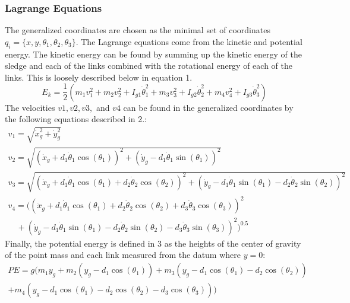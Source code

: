 \documentclass{article}
\begin{document}
\subsubsection{Lagrange Equations}
The generalized coordinates are chosen as the minimal set of coordinates $q_i = \{ x,y,\theta_1,\theta_2,\theta_3 \} $. The Lagrange equations come from the kinetic and potential energy. The kinetic energy can be found by summing up the kinetic energy of the sledge and each of the links combined with the rotational energy of each of the links. This is loosely described below in equation 1.
\begin{equation}\label{Kinetic Energy Equation}
	E_k = \frac{1}{2} \left( m_1 v_1^2 + m_2 v_2^2 + I_{g1} \dot{\theta}_1^2 + m_3 v_3^2 + I_{g2} \dot{\theta}_2^2 + m_4 v_4^2 + I_{g3} \dot{\theta}_3^2 \right) 
\end{equation}
The velocities $v1, v2, v3,$ and $v4$ can be found in the generalized coordinates by the following equations described in 2.:
\begin{equation}
	\begin{split}
		v_1 = \sqrt{\dot{x}_g^2 + \dot{y}_g^2} \\
		v_2 = \sqrt{\left( \dot{x}_g + d_1 \dot{\theta}_1 \cos(\theta_1) \right)^2 + \left( \dot{y}_g - d_1 \dot{\theta}_1 \sin(\theta_1) \right)^2} \\
		v_3 = \sqrt{\left( \dot{x}_g + d_1 \dot{\theta}_1 \cos(\theta_1) + d_2 \dot{\theta}_2 \cos(\theta_2) \right)^2 + \left( \dot{y}_g - d_1 \dot{\theta}_1 \sin(\theta_1) - d_2 \dot{\theta}_2 \sin(\theta_2) \right)^2}\\		
		v_4 = (\left( \dot{x}_g + d_1 \dot{\theta}_1 \cos(\theta_1) + d_2 \dot{\theta}_2 \cos(\theta_2) + d_3 \dot{\theta}_3 \cos(\theta_3) \right)^2 \\
		\quad + \left( \dot{y}_g - d_1 \dot{\theta}_1 \sin(\theta_1) - d_2 \dot{\theta}_2 \sin(\theta_2) - d_3 \dot{\theta}_3 \sin(\theta_3) \right)^2)^{0.5}
	\end{split}
\end{equation}
Finally, the potential energy is defined in 3 as the heights of the center of gravity of the point mass and each link measured from the datum where $y=0$:
\begin{equation}
	\begin{split}
			PE = g ( m_1 y_g + m_2 \left( y_g - d_1 \cos(\theta_1) \right) + m_3 \left( y_g - d_1 \cos(\theta_1) - d_2 \cos(\theta_2) \right) \\
		+ m_4 \left( y_g - d_1 \cos(\theta_1) - d_2 \cos(\theta_2) - d_3 \cos(\theta_3) \right) )	
	\end{split}
\end{equation}
\end{document}
